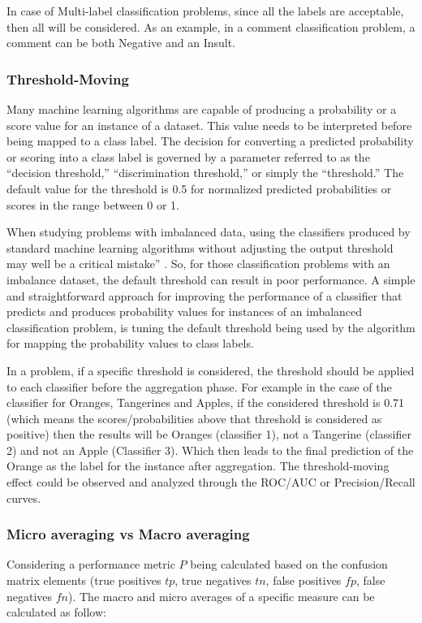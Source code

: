 In case of Multi-label classification problems, since all the labels are acceptable, then all 
will be considered. As an example, in a comment classification problem, a comment can be both 
Negative and an Insult. 


\subsubsection{Threshold-Moving}
Many machine learning algorithms are capable of producing a probability or a score value for 
an instance of a dataset. This value needs to be interpreted before being mapped to a class 
label. The decision for converting a predicted probability or scoring into a class label is 
governed by a parameter referred to as the “decision threshold,” “discrimination threshold,” 
or simply the “threshold.” The default value for the threshold is 0.5 for normalized predicted 
probabilities or scores in the range between 0 or 1.

When studying problems with imbalanced data, using the classifiers produced by standard 
machine learning algorithms without adjusting the output threshold may well be a critical 
mistake” \cite{provost_machine_2000}. So, for those classification problems with an 
imbalance dataset, the default threshold can result in poor performance. A simple and 
straightforward approach for improving the performance of a classifier that predicts and 
produces probability values for instances of an imbalanced classification problem, is 
tuning the default threshold being used by the algorithm for mapping the probability 
values to class labels.

In a problem, if a specific threshold is considered, the threshold should be applied to each 
classifier before the aggregation phase. For example in the case of the classifier for Oranges, 
Tangerines and Apples, if the considered threshold is 0.71 (which means the scores/probabilities 
above that threshold is considered as positive) then the results will be Oranges (classifier 1), 
not a Tangerine (classifier 2) and not an Apple (Classifier 3). Which then leads to the final 
prediction of the Orange as the label for the instance after aggregation. The threshold-moving 
effect could be observed and analyzed through the ROC/AUC  or Precision/Recall curves.

\subsubsection{Micro averaging vs Macro averaging}
Considering a performance metric $P$ being calculated based on the confusion matrix elements 
(true positives $tp$, true negatives $tn$, false positives $fp$, false negatives $fn$). 
The macro and micro averages of a specific measure can be calculated as follow:

